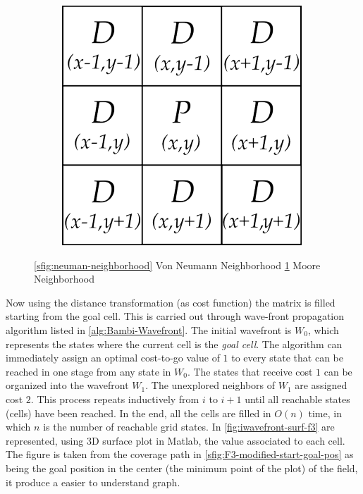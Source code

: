 \begin{figure}[ht]
\begin{subfigure}{.3\textwidth}
  \includegraphics[width=.9\linewidth]{figures/C3/moore-neighborhood.png}
  \caption{}
  \label{sfig:moore-neighborhood}
\end{subfigure}
\caption{\ref{sfig:neuman-neighborhood} Von Neumann Neighborhood \ref{sfig:moore-neighborhood} Moore Neighborhood}
\label{fig:neighborhood}
\end{figure} 

Now using the distance transformation (as cost function) the matrix is filled starting from the goal cell. This is carried out through wave-front propagation algorithm listed in \autoref{alg:Bambi-Wavefront}.
The initial wavefront is $ W_0$, which represents the states where the current cell is the \textit{goal cell}. The algorithm can immediately assign an  optimal cost-to-go value of $ 1$ to every state that can be reached in one stage from any state in $ W_0$. The states that receive cost $ 1$ can be organized into the  wavefront $ W_1$. The unexplored neighbors of $ W_1$ are assigned cost $2$. This  process repeats inductively from $i$ to $ i+1$ until all reachable states (cells) have been reached. In the end, all the cells are filled in $O(n)$ time, in which $ n$ is the number of reachable grid states. In \autoref{fig:iwavefront-surf-f3} are represented, using 3D surface plot in Matlab, the value associated to each cell. The figure is taken from the coverage path in \autoref{sfig:F3-modified-start-goal-pos} as being the goal position in the center (the minimum point of the plot) of the field, it produce a easier to understand graph.


